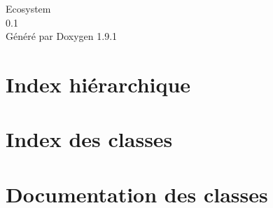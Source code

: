 \let\mypdfximage\pdfximage\def\pdfximage{\immediate\mypdfximage}\documentclass[twoside]{book}
\newcommand{\+}{\discretionary{\mbox{\scriptsize$\hookleftarrow$}}{}{}}
\newcommand{\clearemptydoublepage}{%
  \newpage{\pagestyle{empty}\cleardoublepage}%
}
\begin{document}
\raggedbottom

\hypersetup{pageanchor=false,
             bookmarksnumbered=true,
             pdfencoding=unicode
            }
\begin{titlepage}
\vspace*{7cm}
\begin{center}%
{\Large Ecosystem \\[1ex]\large 0.\+1 }\\
\vspace*{1cm}
{\large Généré par Doxygen 1.9.1}\\
\end{center}
\end{titlepage}
\clearemptydoublepage
{}
\tableofcontents
\clearemptydoublepage
{}
\hypersetup{pageanchor=true}

\chapter{Index hiérarchique}

\chapter{Index des classes}

\chapter{Documentation des classes}






































\backmatter
\newpage
{}
\clearemptydoublepage
{}
\printindex
\end{document}
